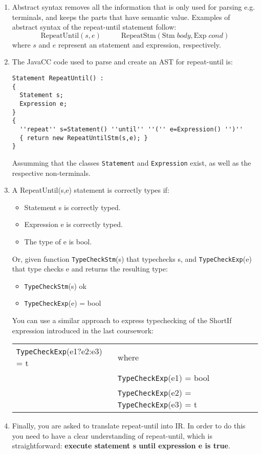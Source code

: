 \documentclass[11pt]{article}
\newcommand{\syntax}[1]{\texttt{#1}}
\begin{document}
\begin{enumerate}
\item Abstract syntax removes all the information that is only used for parsing e.g. terminals, and keeps the parts that have semantic value. Examples of abstract syntax of the repeat-until statement follow:
$$\mbox{RepeatUntil}(s,e)  \;\;\;\;\;\;\;\;\;\;
\mbox{RepeatStm}(\mbox{Stm}\; body, \mbox{Exp}\; cond)
$$
where $s$ and $e$ represent an statement and expression, respectively.

\item The JavaCC code used to parse and create an AST for repeat-until is:
\begin{verbatim}
Statement RepeatUntil() :
{
  Statement s;
  Expression e;
}
{
  ''repeat'' s=Statement() ''until'' ''('' e=Expression() '')''
  { return new RepeatUntilStm(s,e); }
}
\end{verbatim}
Assumming that the classes \verb+Statement+ and \verb+Expression+ exist, as well as the respective non-terminals.

\item A RepeatUntil(s,e) statement is correctly types if:
\begin{itemize}
\item Statement s is correctly typed.
\item Expression e is correctly typed.
\item The type of e is bool.
\end{itemize}
Or, given function \syntax{TypeCheckStm}(s) that typechecks s,  and \syntax{TypeCheckExp}(e) that type checks e and returns the resulting type:
\begin{itemize}
\item \syntax{TypeCheckStm}(s)  ok
\item \syntax{TypeCheckExp}(e) = bool
\end{itemize}

You can use a similar approach to express typechecking of the ShortIf expression introduced in the last coursework:

\begin{tabular}{ll}
\syntax{TypeCheckExp}(e1?e2:e3) = t & where \\
& \syntax{TypeCheckExp}(e1) = bool \\
& \syntax{TypeCheckExp}(e2) = \syntax{TypeCheckExp}(e3) = t
\end{tabular}

\item Finally, you are asked to translate repeat-until into IR. In order to do this you need to have a clear understanding of repeat-until, which is straightforward: \textbf{execute statement s until expression e is true}.


\end{enumerate}
\end{document}
